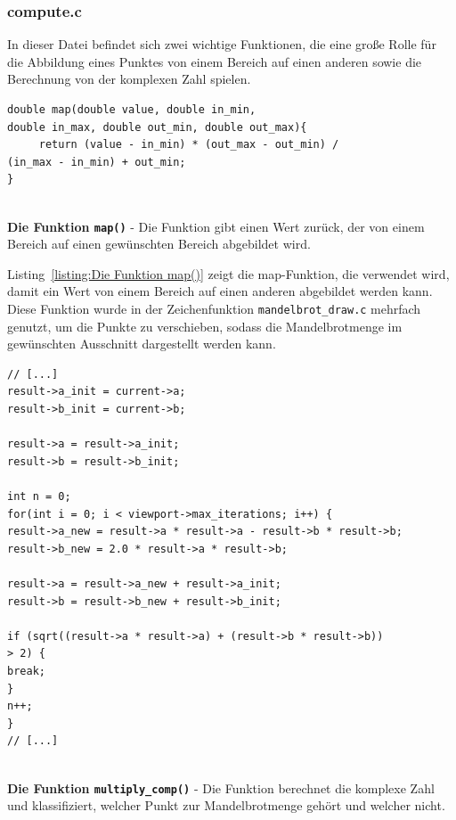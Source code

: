 \documentclass[ngerman,12pt,a4paper,titlepage]{article}
\begin{document}
\subsubsection{compute.c}
\begin{sloppypar}
In dieser Datei befindet sich zwei wichtige Funktionen, die eine große Rolle für die Abbildung eines Punktes von einem Bereich auf einen anderen sowie die Berechnung von der komplexen Zahl spielen. 

\begin{listing}[H]
	\begin{verbatim}
double map(double value, double in_min, 
double in_max, double out_min, double out_max){
     return (value - in_min) * (out_max - out_min) / 
(in_max - in_min) + out_min;
}
		
	\end{verbatim}
	\caption[\textbf{Die Funktion \texttt{map()}}]{\textbf{Die Funktion \texttt{map()}} - Die Funktion gibt einen Wert zurück, der von einem Bereich auf einen gewünschten Bereich abgebildet wird.}
	\label{listing:Die Funktion map()}
\end{listing}


Listing~\ref{listing:Die Funktion map()} zeigt die map-Funktion, die verwendet wird, damit ein Wert von einem Bereich auf einen anderen abgebildet werden kann. Diese Funktion wurde in der Zeichenfunktion \texttt{mandelbrot\_draw.c} mehrfach genutzt, um die Punkte zu verschieben, sodass die Mandelbrotmenge im gewünschten Ausschnitt dargestellt werden kann.


\begin{listing}[H]
	\begin{verbatim}
// [...]
result->a_init = current->a;
result->b_init = current->b;
		
result->a = result->a_init;
result->b = result->b_init;
		
int n = 0;
for(int i = 0; i < viewport->max_iterations; i++) {
result->a_new = result->a * result->a - result->b * result->b;
result->b_new = 2.0 * result->a * result->b;
			
result->a = result->a_new + result->a_init;
result->b = result->b_new + result->b_init;
			
if (sqrt((result->a * result->a) + (result->b * result->b))
> 2) {
break;
}
n++;
}
// [...]
		
	\end{verbatim}
	\caption[\textbf{Die Funktion \texttt{multiply\_comp()}}]{\textbf{Die Funktion \texttt{multiply\_comp()}} - Die Funktion berechnet die komplexe Zahl und klassifiziert, welcher Punkt zur Mandelbrotmenge gehört und welcher nicht.}
	\label{listing:Die Funktion multiply-comp()}
\end{listing}


\end{sloppypar}
\end{document}
